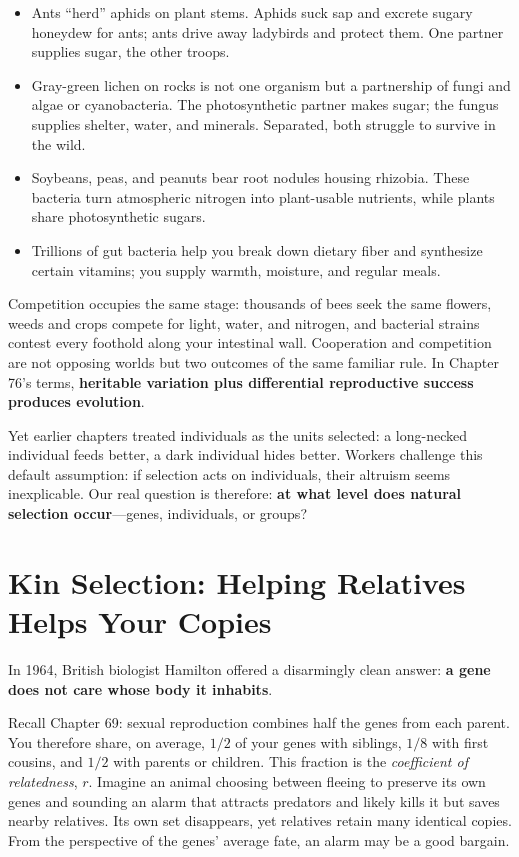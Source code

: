 \begin{itemize}[itemsep=2pt]
\item Ants ``herd'' aphids on plant stems. Aphids suck sap and excrete sugary honeydew for ants; ants drive away ladybirds and protect them. One partner supplies sugar, the other troops.
\item Gray-green lichen on rocks is not one organism but a partnership of fungi and algae or cyanobacteria. The photosynthetic partner makes sugar; the fungus supplies shelter, water, and minerals. Separated, both struggle to survive in the wild.
\item Soybeans, peas, and peanuts bear root nodules housing rhizobia. These bacteria turn atmospheric nitrogen into plant-usable nutrients, while plants share photosynthetic sugars.
\item Trillions of gut bacteria help you break down dietary fiber and synthesize certain vitamins; you supply warmth, moisture, and regular meals.
\end{itemize}

Competition occupies the same stage: thousands of bees seek the same flowers, weeds and crops compete for light, water, and nitrogen, and bacterial strains contest every foothold along your intestinal wall. Cooperation and competition are not opposing worlds but two outcomes of the same familiar rule. In Chapter 76's terms, \textbf{heritable variation plus differential reproductive success produces evolution}.

Yet earlier chapters treated individuals as the units selected: a long-necked individual feeds better, a dark individual hides better. Workers challenge this default assumption: if selection acts on individuals, their altruism seems inexplicable. Our real question is therefore: \textbf{at what level does natural selection occur}---genes, individuals, or groups?

\section{Kin Selection: Helping Relatives Helps Your Copies}

In 1964, British biologist Hamilton offered a disarmingly clean answer: \textbf{a gene does not care whose body it inhabits}.

Recall Chapter 69: sexual reproduction combines half the genes from each parent. You therefore share, on average, $1/2$ of your genes with siblings, $1/8$ with first cousins, and $1/2$ with parents or children. This fraction is the \emph{coefficient of relatedness}, $r$. Imagine an animal choosing between fleeing to preserve its own genes and sounding an alarm that attracts predators and likely kills it but saves nearby relatives. Its own set disappears, yet relatives retain many identical copies. From the perspective of the genes' average fate, an alarm may be a good bargain.

